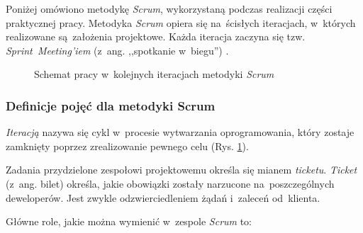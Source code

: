 Poniżej omówiono metodykę \textit{Scrum}, wykorzystaną podczas realizacji części praktycznej pracy. Metodyka \textit{Scrum} opiera się na~ścisłych iteracjach, w~których realizowane są~założenia projektowe. Każda iteracja zaczyna się tzw. \textit{Sprint~Meeting'iem} (z~ang. ,,spotkanie w~biegu'') \cite{scrumaliance}.

\begin{figure}[!t]
\centering
{}
\caption[Schemat pracy w metodyce \textit{Scrum}]{Schemat pracy w~kolejnych iteracjach metodyki \textit{Scrum} \cite{scrum.schema}}
\label{fig.rysunek.scrum}
\end{figure}

\subsubsection{Definicje pojęć dla metodyki Scrum} \label{scrum.definicje}

\textit{Iteracją} nazywa się cykl w~procesie wytwarzania oprogramowania, który zostaje zamknięty poprzez zrealizowanie pewnego celu (Rys. \ref{fig.rysunek.scrum}).


Zadania przydzielone zespołowi projektowemu określa się mianem \textit{ticketu}. \textit{Ticket} (z~ang. bilet) określa, jakie obowiązki zostały narzucone na~poszczególnych deweloperów. Jest zwykle odzwierciedleniem żądań i~zaleceń od~klienta.


Główne role, jakie można wymienić w~zespole \textit{Scrum} to:

